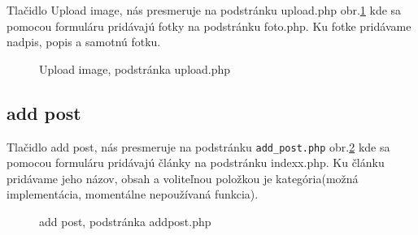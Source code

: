 Tlačidlo Upload image, nás presmeruje na podstránku upload.php obr.\ref{OBRAZOK 1.10} kde sa pomocou formuláru pridávajú fotky na podstránku foto.php. Ku fotke pridávame nadpis, popis a samotnú fotku.

\begin{figure}[!tbh]
\centering
\setlength{\fboxsep}{0pt}%
\setlength{\fboxrule}{1pt}%
\caption{Upload image, podstránka upload.php }\label{OBRAZOK 1.10}
\end{figure}

\subsection{add post}

Tlačidlo add post, nás presmeruje na podstránku \verb|add_post.php| obr.\ref{OBRAZOK 1.11} kde sa pomocou formuláru pridávajú články na podstránku indexx.php. Ku článku pridávame jeho názov, obsah a voliteľnou položkou je kategória(možná implementácia, momentálne nepoužívaná funkcia).

\begin{figure}[!tbh]
\centering
\setlength{\fboxsep}{0pt}%
\setlength{\fboxrule}{1pt}%
\caption{add post, podstránka addpost.php}\label{OBRAZOK 1.11}
\end{figure}

